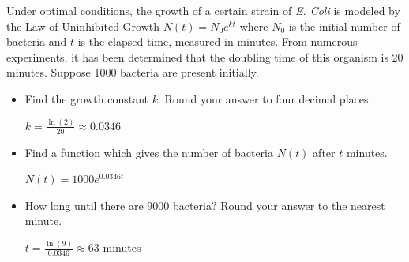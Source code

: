 \documentclass{ximera}
\begin{document}
\begin{problem}
 Under optimal conditions, the growth of a certain strain of \textit{E. Coli} is modeled by the Law of Uninhibited Growth $N(t) = N_{0} e^{kt}$ 
 where $N_{0}$ is the initial number of bacteria and $t$ is the elapsed time, measured in minutes. From numerous experiments, it has been determined that the doubling time of this organism is 20 minutes. Suppose 1000 bacteria are present initially.

\begin{itemize}
    \item 
     Find the growth constant $k$. Round your answer to four decimal places.

\begin{solution}
    $k = \frac{\ln(2)}{20} \approx 0.0346$
\end{solution}
     
\item
     Find a function which gives the number of bacteria $N(t)$ after $t$ minutes.

\begin{solution}
    $N(t) = 1000e^{0.0346 t}$
\end{solution}
     
\item
    How long until there are 9000 bacteria?  Round your answer to the nearest minute.

\begin{solution}
     $t = \frac{\ln(9)}{0.0346} \approx 63$ minutes
\end{solution}
    
\end{itemize}

\end{problem}
\end{document}
